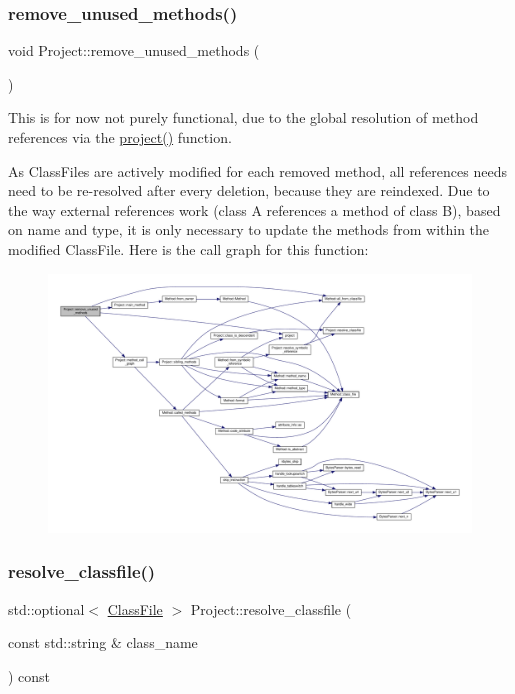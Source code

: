 \subsubsection{\texorpdfstring{remove\+\_\+unused\+\_\+methods()}{remove\_unused\_methods()}}
{\footnotesize\ttfamily void Project\+::remove\+\_\+unused\+\_\+methods (\begin{DoxyParamCaption}{ }\end{DoxyParamCaption})}

This is for now not purely functional, due to the global resolution of method references via the {\ttfamily \hyperlink{project_8cpp_a3c33c839f231786a482d8b5a76c269d3}{project()}} function.

As Class\+Files are actively modified for each removed method, all references needs need to be re-\/resolved after every deletion, because they are reindexed. Due to the way external references work (class A references a method of class B), based on name and type, it is only necessary to update the methods from within the modified Class\+File. Here is the call graph for this function\+:\nopagebreak
\begin{figure}[H]
\begin{center}
\leavevmode
\includegraphics[width=350pt]{classProject_af5f35c59d1175af1cfa659a597bb6353_cgraph}
\end{center}
\end{figure}
\mbox{\label{classProject_a2ec0981bc841bcbac0ca8072f3b960b5}} 
\subsubsection{\texorpdfstring{resolve\+\_\+classfile()}{resolve\_classfile()}}
{\footnotesize\ttfamily std\+::optional$<$ \hyperlink{classfile_8h_a00b46b60bc40e813e9fb1bb049174346}{Class\+File} $>$ Project\+::resolve\+\_\+classfile (\begin{DoxyParamCaption}\item[{const std\+::string \&}]{class\+\_\+name }\end{DoxyParamCaption}) const}



